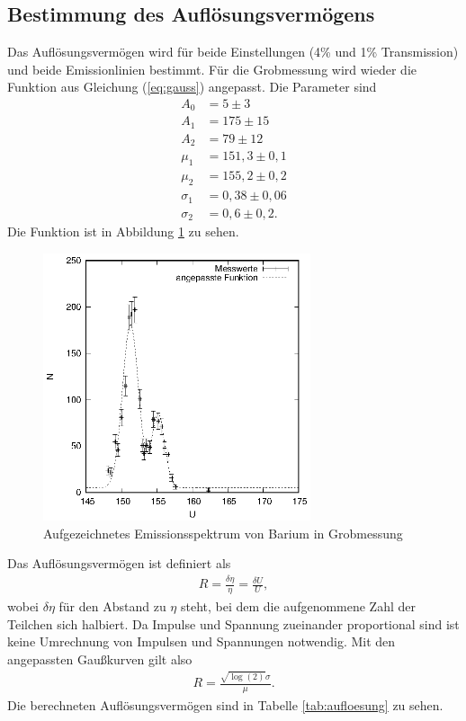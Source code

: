 \subsection{Bestimmung des Auflösungsvermögens}
Das Auflösungsvermögen wird für beide Einstellungen (4\% und 1\% Transmission) und beide Emissionlinien bestimmt. Für die Grobmessung wird wieder die Funktion aus Gleichung (\ref{eq:gauss}) angepasst. Die Parameter sind
\begin{align*}
  A_0&=5\pm 3\\
  A_1&=175\pm 15\\
  A_2&=79\pm 12\\
  \mu_1&=151,3 \pm 0,1\\
  \mu_2&=155,2 \pm 0,2\\
  \sigma_1&=0,38 \pm 0,06\\
  \sigma_2&=0,6 \pm 0,2.
\end{align*}
Die Funktion ist in Abbildung \ref{fig:ba_grob} zu sehen.
\begin{figure}[h]
  \centering
  \includegraphics[width=0.7\textwidth]{data/Ba_grob.eps}
  \caption{Aufgezeichnetes Emissionsspektrum von Barium in Grobmessung}
  \label{fig:ba_grob}
\end{figure}

Das Auflösungsvermögen ist definiert als
\begin{align*}
  R=\frac{\delta\eta}{\eta}=\frac{\delta U}{U},
\end{align*}
wobei $\delta\eta$ für den Abstand zu $\eta$ steht, bei dem die aufgenommene Zahl der Teilchen sich halbiert. Da Impulse und Spannung zueinander proportional sind ist keine Umrechnung von Impulsen und Spannungen notwendig. Mit den angepassten Gaußkurven gilt also 
\begin{align*}
  R=\frac{\sqrt{\log(2)} \sigma}{\mu}.
\end{align*}
Die berechneten Auflösungsvermögen sind in Tabelle \ref{tab:aufloesung} zu sehen.

